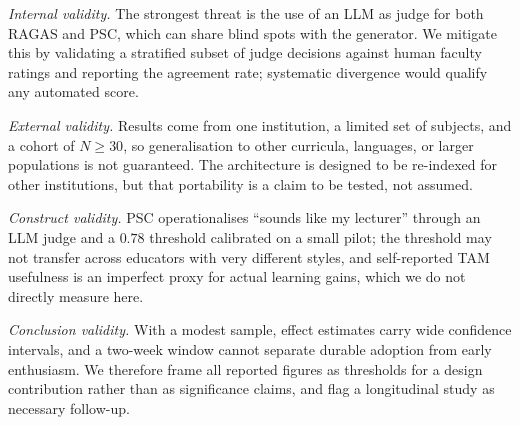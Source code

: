 \documentclass[conference]{IEEEtran}
\begin{document}
\textit{Internal validity.} The strongest threat is the use of an LLM
as judge for both RAGAS and PSC, which can share blind spots with the
generator. We mitigate this by validating a stratified subset of judge
decisions against human faculty ratings and reporting the agreement
rate; systematic divergence would qualify any automated score.

\textit{External validity.} Results come from one institution, a
limited set of subjects, and a cohort of $N \geq 30$, so
generalisation to other curricula, languages, or larger populations is
not guaranteed. The architecture is designed to be re-indexed for other
institutions, but that portability is a claim to be tested, not assumed.

\textit{Construct validity.} PSC operationalises ``sounds like my
lecturer'' through an LLM judge and a $0.78$ threshold calibrated on a
small pilot; the threshold may not transfer across educators with very
different styles, and self-reported TAM usefulness is an imperfect proxy
for actual learning gains, which we do not directly measure here.

\textit{Conclusion validity.} With a modest sample, effect estimates
carry wide confidence intervals, and a two-week window cannot separate
durable adoption from early enthusiasm. We therefore frame all reported
figures as thresholds for a design contribution rather than as
significance claims, and flag a longitudinal study as necessary
follow-up.
\end{document}
